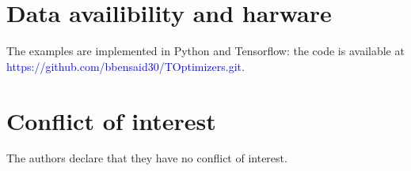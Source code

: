 \documentclass[article,authoryear,jmlmc]{beg_32}             %
\begin{document}
\section*{Data availibility and harware}
The examples are implemented in Python and Tensorflow: the code is available at \textcolor{blue} {https://github.com/bbensaid30/TOptimizers.git}. 

\section*{Conflict of interest}
The authors declare that they have no conflict of interest.

\newpage

%




\appendix
\end{document}
